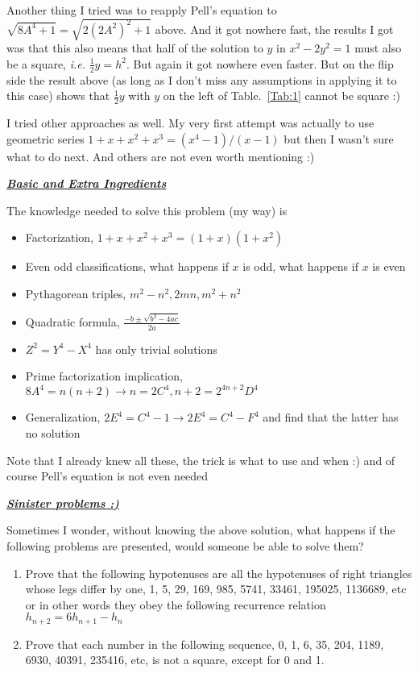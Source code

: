 \documentclass[aps,preprint,preprintnumbers,nofootinbib,showpacs,prd]{revtex4-1}
\newcommand{\ie}{{\it i.e.} }
\newcommand{\bit}{\begin{itemize}}
\newcommand{\eit}{\end{itemize}}
\begin{document}
Another thing I tried was to reapply Pell's equation to $\sqrt{8A^4 + 1} = \sqrt{2(2A^2)^2 + 1}$ above. And it got nowhere fast, the results I got was that this also means that half of the solution to $y$ in $x^2 - 2y^2 = 1$ must also be a square, \ie $\frac{1}{2}y = h^2$. But again it got nowhere even faster. But on the flip side the result above (as long as I don't miss any assumptions in applying it to this case) shows that $\frac{1}{2}y$ with $y$ on the left of Table.~\ref{Tab:1} cannot be square :)

I tried other approaches as well. My very first attempt was actually to use geometric series $1 + x + x^2 + x^3 = (x^4 - 1)/(x - 1)$ but then I wasn't sure what to do next. And others are not even worth mentioning :)

\bigskip
\underline{\textbf{\textit{Basic and Extra Ingredients}}}

The knowledge needed to solve this problem (my way) is
\bit
\item Factorization, $1 + x + x^2 + x^3 = (1 + x)(1 + x^2)$
%
\item Even odd classifications, what happens if $x$ is odd, what happens if $x$ is even
%
\item Pythagorean triples, $m^2 - n^2, 2mn, m^2 + n^2$
%
\item Quadratic formula, $\frac{-b \pm \sqrt{b^2 - 4ac}}{2a}$
%
\item $Z^2 = Y^4 - X^4$ has only trivial solutions
%
\item Prime factorization implication, $8A^4 = n(n+2) \to n = 2C^4, n + 2 = 2^{4n+2}D^4$
%
\item Generalization, $2E^4 = C^4 - 1 \to 2E^4 = C^4 - F^4$ and find that the latter has no solution
\eit
%
Note that I already knew all these, the trick is what to use and when :) and of course Pell's equation is not even needed


\bigskip
\underline{\textbf{\textit{Sinister problems :)}}}

Sometimes I wonder, without knowing the above solution, what happens if the following problems are presented, would someone be able to solve them?
\begin{enumerate}
\item Prove that the following hypotenuses are all the hypotenuses of right triangles whose legs differ by one, 1, 5, 29, 169, 985, 5741, 33461, 195025, 1136689, etc or in other words they obey the following recurrence relation $h_{n+2} = 6h_{n+1} - h_n$
%
\item Prove that each number in the following sequence, 0, 1, 6, 35, 204, 1189, 6930, 40391, 235416, etc, is not a square, except for 0 and 1.
\end{enumerate}
\end{document}
